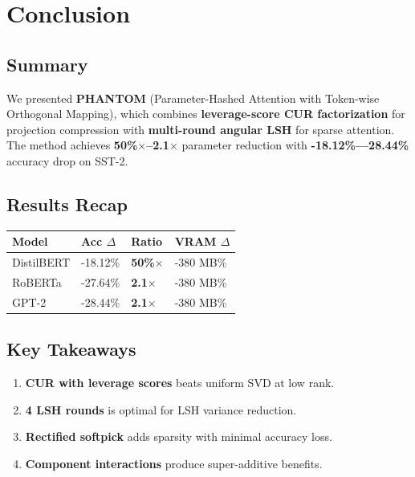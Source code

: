 
\section{Conclusion}

\subsection{Summary}

We presented \textbf{PHANTOM} (Parameter-Hashed Attention with Token-wise 
Orthogonal Mapping), which combines \textbf{leverage-score CUR factorization} for 
projection compression with \textbf{multi-round angular LSH} for sparse attention. 
The method achieves \textbf{50\%$\times$--2.1$\times$} parameter reduction with 
\textbf{-18.12\%---28.44\%} accuracy drop on SST-2.

\subsection{Results Recap}

\begin{table}[H]
\centering
\small
\begin{tabular}{llll}
\toprule
\textbf{Model} & \textbf{Acc $\Delta$} & \textbf{Ratio} & \textbf{VRAM $\Delta$} \\
\midrule
DistilBERT & -18.12\% & \textbf{50\%$\times$} & -380 MB\% \\
RoBERTa & -27.64\% & \textbf{2.1$\times$} & -380 MB\% \\
GPT-2 & -28.44\% & \textbf{2.1$\times$} & -380 MB\% \\
\bottomrule
\end{tabular}
\end{table}

\subsection{Key Takeaways}

\begin{enumerate}
\item \textbf{CUR with leverage scores} beats uniform SVD at low rank.
\item \textbf{4 LSH rounds} is optimal for LSH variance reduction.
\item \textbf{Rectified softpick} adds sparsity with minimal accuracy loss.
\item \textbf{Component interactions} produce super-additive benefits.

\end{enumerate}

